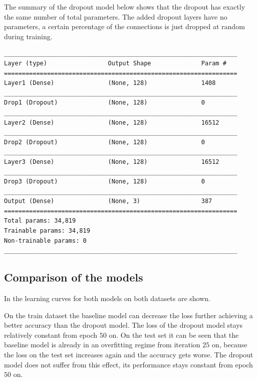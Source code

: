 \documentclass[12pt,a4paper]{scrartcl}
\begin{document}
The summary of the dropout model below shows that the dropout has exactly the same number of total parameters. The added dropout layers have no parameters, a certain percentage  of the connections is just dropped at random during training.
	
	
		\begin{lstlisting}[caption=Summary of dropout model]
_________________________________________________________________
Layer (type)                 Output Shape              Param #   
=================================================================
Layer1 (Dense)               (None, 128)               1408      
_________________________________________________________________
Drop1 (Dropout)              (None, 128)               0         
_________________________________________________________________
Layer2 (Dense)               (None, 128)               16512     
_________________________________________________________________
Drop2 (Dropout)              (None, 128)               0         
_________________________________________________________________
Layer3 (Dense)               (None, 128)               16512     
_________________________________________________________________
Drop3 (Dropout)              (None, 128)               0         
_________________________________________________________________
Output (Dense)               (None, 3)                 387       
=================================================================
Total params: 34,819
Trainable params: 34,819
Non-trainable params: 0
_________________________________________________________________
	\end{lstlisting}
	
	\subsection*{Comparison of the models}
	
	In  the learning curves for both models on both datasets are shown.
	
  On the train dataset the baseline model can decrease the loss further achieving a better accuracy than the dropout model. The loss of the dropout model stays relatively constant from epoch $50$ on.
  On the test set it can be seen that the baseline model is already in an overfitting regime from iteration $25$ on, because the loss on the test set increases again and the accuracy gets worse.
  The dropout model does not suffer from this effect, its performance stays constant from epoch $50$ on.
	
\end{document}

